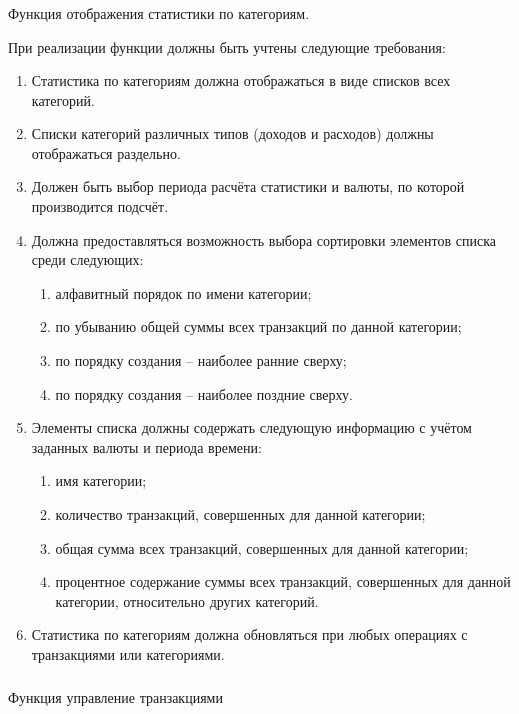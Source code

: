 \subsubsection{} Функция отображения статистики по категориям.
\label{sec:domain:specification:categories_stats}

При реализации функции должны быть учтены следующие требования:

\begin{enumerate}
    \item Статистика по категориям должна отображаться в виде списков всех категорий.
    \item Списки категорий различных типов (доходов и расходов) должны отображаться раздельно.
    \item Должен быть выбор периода расчёта статистики и валюты, по которой производится подсчёт.
    \item Должна предоставляться возможность выбора сортировки элементов списка среди следующих:
    \begin{enumerate}
        \item алфавитный порядок по имени категории;
        \item по убыванию общей суммы всех транзакций по данной категории;
        \item по порядку создания -- наиболее ранние сверху;
        \item по порядку создания -- наиболее поздние сверху.
    \end{enumerate}
    \item Элементы списка должны содержать следующую информацию с учётом заданных валюты и периода времени:
    \begin{enumerate}
        \item имя категории;
        \item количество транзакций, совершенных для данной категории;
        \item общая сумма всех транзакций, совершенных для данной категории;
        \item процентное содержание суммы всех транзакций, совершенных для данной категории, относительно других категорий.
    \end{enumerate}
    \item Статистика по категориям должна обновляться при любых операциях с транзакциями или категориями.
\end{enumerate}

\subsubsection{} Функция управление транзакциями
\label{sec:domain:specification:transactions}


